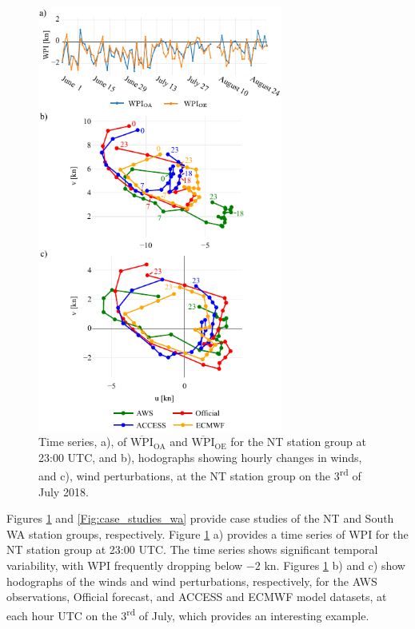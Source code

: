 \documentclass{ametsoc}
\begin{document}
\begin{figure}
\centering
\includegraphics[width=19pc]{case_studies_nt.pdf}
\caption{Time series, a), of $\overline{\text{WPI}}_\text{OA}$ and $\overline{\text{WPI}}_\text{OE}$ for the NT station group at 23:00 UTC, and b), hodographs showing hourly changes in winds, and c), wind perturbations, at the NT station group on the 3\textsuperscript{rd} of July 2018.} 
\label{Fig:case_studies_nt}
\end{figure}

Figures \ref{Fig:case_studies_nt} and \ref{Fig:case_studies_wa} provide case studies of the NT and South WA station groups, respectively. Figure \ref{Fig:case_studies_nt} a) provides a time series of WPI for the NT station group at 23:00 UTC. The time series shows significant temporal variability, with WPI frequently dropping below $-2$ kn. Figures \ref{Fig:case_studies_nt} b) and c) show hodographs of the winds and wind perturbations, respectively, for the AWS observations, Official forecast, and ACCESS and ECMWF model datasets, at each hour UTC on the 3\textsuperscript{rd} of July, which provides an interesting example. 
\end{document}
